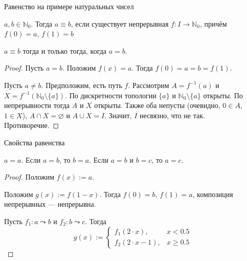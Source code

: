 \documentclass[aspectratio=169,dvipsnames,usenames]{beamer}
\begin{document}
\begin{frame}{Равенство на примере натуральных чисел}
\begin{dfn}$a,b \in \mathbb{N}_0$. Тогда $a\equiv b$, если существует непрерывная $f: I\rightarrow\mathbb{N}_0$, причём $f(0)=a$, $f(1)=b$\end{dfn}
\begin{lmm}$a\equiv b$ тогда и только тогда, когда $a=b$.\end{lmm}
\begin{proof}Пусть $a = b$. Положим $f(x) = a$. Тогда $f(0)=a=b=f(1)$.

Пусть $a \ne b$. Предположим, есть путь $f$. Рассмотрим $A=f^{-1}(a)$ и $X=f^{-1}(\mathbb{N}_0\setminus\{a\})$. 
По дискретности топологии $\{a\}$ и $\mathbb{N}_0\setminus\{a\}$ открыты. По непрерывности тогда $A$ и $X$ открыты.
Также оба непусты (очевидно, $0 \in A$, $1 \in X$), $A \cap X = \varnothing$ и $A \cup X = I$. Значит, $I$ несвязно, что не так.
Противоречие.
\end{proof}
\end{frame}

\begin{frame}{Свойства равенства}
\begin{thm}
$a = a$.
Если $a = b$, то $b = a$.
Если $a = b$ и $b = c$, то $a = c$.
\end{thm}
\begin{proof}
Положим $f(x) := a$.

Положим $g(x) := f(1 - x)$. Тогда $f(0) = b$, $f(1) = a$, композиция непрерывных --- непрерывна.

Пусть $f_1: a \leadsto b$ и $f_2: b \leadsto c$.
Тогда $$g(x) := \left\{\begin{array}{ll}f_1(2\cdot x),& x < 0.5\\f_2(2\cdot x -1),& x\ge 0.5\end{array}\right.$$
\end{proof}
\end{frame}
\end{document}
